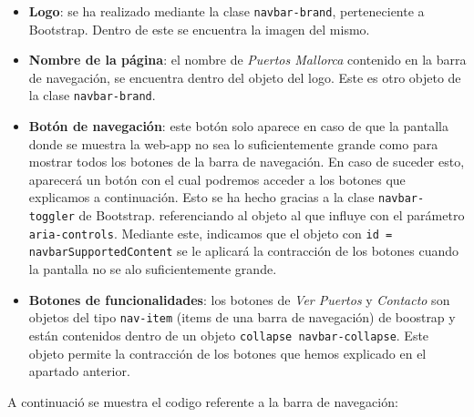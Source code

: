 \documentclass{article}
\begin{document}
\begin{itemize}
    \item \textbf{Logo}: se ha realizado mediante la clase \texttt{navbar-brand}, perteneciente a Bootstrap. Dentro de este se encuentra la imagen del mismo.
    \item \textbf{Nombre de la página}: el nombre de \textit{Puertos Mallorca} contenido en la barra de navegación, se encuentra dentro del objeto del logo. Este es otro objeto de la clase \texttt{navbar-brand}.
    \item \textbf{Botón de navegación}: este botón solo aparece en caso de que la pantalla donde se muestra la web-app no sea lo suficientemente grande como para mostrar todos los botones de la barra de navegación. En caso de suceder esto, aparecerá un botón con el cual podremos acceder a los botones que explicamos a continuación. Esto se ha hecho gracias a la clase \texttt{navbar-toggler} de Bootstrap. referenciando al objeto al que influye con el parámetro \texttt{aria-controls}. Mediante este, indicamos que el objeto con \texttt{id = navbarSupportedContent} se le aplicará la contracción de los botones cuando la pantalla no se alo suficientemente grande.
    \item \textbf{Botones de funcionalidades}: los botones de \textit{Ver Puertos} y \textit{Contacto} son objetos del tipo \texttt{nav-item} (items de una barra de navegación) de boostrap y están contenidos dentro de un objeto \texttt{collapse navbar-collapse}. Este objeto permite la contracción de los botones que hemos explicado en el apartado anterior.
\end{itemize}
\newpage
A continuació se muestra el codigo referente a la barra de navegación:
\end{document}
